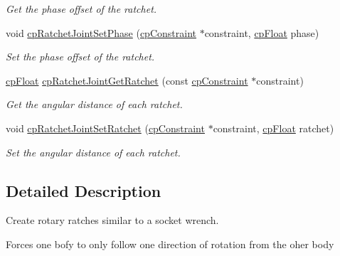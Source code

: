 \begin{DoxyCompactItemize}
\begin{DoxyCompactList}\small\item\em Get the phase offset of the ratchet. \end{DoxyCompactList}\item 
\hypertarget{group__cp_ratchet_joint_gabab5010b9b678ab888f125c2c031967d}{}void \hyperlink{group__cp_ratchet_joint_gabab5010b9b678ab888f125c2c031967d}{cp\+Ratchet\+Joint\+Set\+Phase} (\hyperlink{structcp_constraint}{cp\+Constraint} $\ast$constraint, \hyperlink{group__basic_types_gac1ed65573e035bf892505768c852d8d3}{cp\+Float} phase)\label{group__cp_ratchet_joint_gabab5010b9b678ab888f125c2c031967d}

\begin{DoxyCompactList}\small\item\em Set the phase offset of the ratchet. \end{DoxyCompactList}\item 
\hypertarget{group__cp_ratchet_joint_ga6b9121fab81bb09ec05043078a4fe90e}{}\hyperlink{group__basic_types_gac1ed65573e035bf892505768c852d8d3}{cp\+Float} \hyperlink{group__cp_ratchet_joint_ga6b9121fab81bb09ec05043078a4fe90e}{cp\+Ratchet\+Joint\+Get\+Ratchet} (const \hyperlink{structcp_constraint}{cp\+Constraint} $\ast$constraint)\label{group__cp_ratchet_joint_ga6b9121fab81bb09ec05043078a4fe90e}

\begin{DoxyCompactList}\small\item\em Get the angular distance of each ratchet. \end{DoxyCompactList}\item 
\hypertarget{group__cp_ratchet_joint_ga6c3d4092a4fa0f1da7b50832028d84dc}{}void \hyperlink{group__cp_ratchet_joint_ga6c3d4092a4fa0f1da7b50832028d84dc}{cp\+Ratchet\+Joint\+Set\+Ratchet} (\hyperlink{structcp_constraint}{cp\+Constraint} $\ast$constraint, \hyperlink{group__basic_types_gac1ed65573e035bf892505768c852d8d3}{cp\+Float} ratchet)\label{group__cp_ratchet_joint_ga6c3d4092a4fa0f1da7b50832028d84dc}

\begin{DoxyCompactList}\small\item\em Set the angular distance of each ratchet. \end{DoxyCompactList}\end{DoxyCompactItemize}


\subsection{Detailed Description}
Create rotary ratches similar to a socket wrench. 

Forces one bofy to only follow one direction of rotation from the oher body 